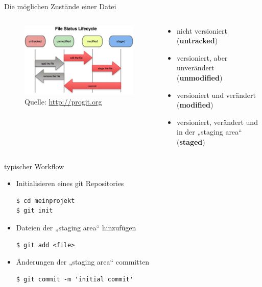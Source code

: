 \begin{frame}{Die möglichen Zustände einer Datei}
  \begin{columns}
    \begin{column}{0.45\textwidth}
      \begin{figure}
        \includegraphics[width=\textwidth]{img/file_lifecycle}
        \caption[format=empty]{Quelle: \url{http://progit.org}}
      \end{figure}
    \end{column}
    \begin{column}{0.65\textwidth}
      \begin{itemize}
        \item nicht versioniert (\textbf{untracked})
        \item versioniert, aber unverändert (\textbf{unmodified})
        \item versioniert und verändert (\textbf{modified})
        \item versioniert, verändert und in der „staging area“ (\textbf{staged})
      \end{itemize}
    \end{column}
  \end{columns}
\end{frame}

\begin{frame}[fragile]{typischer Workflow}
  \begin{itemize}
    \item Initialisieren eines git Repositories
    \begin{lstlisting}
$ cd meinprojekt
$ git init
    \end{lstlisting}
    \item Dateien der „staging area“ hinzufügen
    \begin{lstlisting}
$ git add <file>
    \end{lstlisting}
    \item Änderungen der „staging area“ committen
    \begin{lstlisting}
$ git commit -m 'initial commit'
    \end{lstlisting}
    \end{itemize}
\end{frame}

